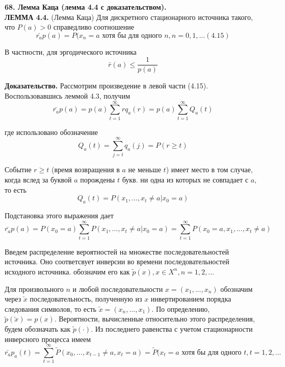 \documentclass[14pt]{article}
\begin{document}
\bigskip
\textbf{68. Лемма Каца (лемма 4.4 с доказательством).} \\

\textbf{ЛЕММА 4.4.} (Лемма Каца) Для дискретного стационарного источника такого, что \(P(a) > 0\) справедливо соотношение \[\bar{r_a}p(a)= P(x_n = a \textrm{ хотя бы для одного } n, n = 0, 1, ...    (4.15)\]

В частности, для эргодического источника
\begin{displaymath}
    \bar{r}(a) \leq \frac{1}{p(a)}
\end{displaymath}

\textbf{Доказательство.} Рассмотрим произведение в левой части (4.15). Воспользовавшись леммой 4.3, получим
\begin{displaymath}
    \bar{r_a}p(a) = p(a) \sum_{t=1}^{\infty} r q_a(r) = p(a) \sum_{t=1}^{\infty} Q_a(t)
\end{displaymath}

где использовано обозначение
\begin{displaymath}
    Q_a(t) = \sum_{j=t}^{\infty} q_a(j) = P(r \geq t)
\end{displaymath}

Событие \(r \geq t\) (время возвращения в \(a\) не меньше \(t\)) имеет место в том случае, когда вслед за буквой \(a\) порождены \(t\) букв. ни одна из которых не совпадает с \(a\), то есть
\begin{displaymath}
    Q_a(t) = P(x_1,...,x_t \neq a|x_0 = a)
\end{displaymath}

Подстановка этого выражения дает
\begin{displaymath}
    \bar{r_a}p(a) = P(x_0 = a) \sum_{t=1}^{\infty} P(x_1,...,x_t \neq a|x_0 = a) = \sum_{t=1}^{\infty} P(x_0 = a,x_1,...,x_t \neq a)
\end{displaymath}

Введем распределение вероятностей на множестве последовательностей источника. Оно соответсвует инверсии во времени последовательностей исходного источника. обозначим его как  \(\tilde{p}(x), x \in X^n, n = 1, 2, ...\)

Для произвольного \(n\) и любой последовательности \(x = (x_1,...,x_n)\) обозначим через \(\overleftarrow{x}\) последовательность, полученную из \(x\)  инвертированием порядка следования символов, то есть \(\overleftarrow{x} = (x_n,...,x_1)\). По определению, \(\tilde{p}(\overleftarrow{x}) = p(x)\). Вероятности, вычисленные относительно этого распределения, будем обозначать как \(\tilde{p}(\cdot)\). Из последнего равенства с учетом стационарности инверсного процесса имеем
\begin{displaymath}
    \bar{r_a}p_a(t) = \sum_{t=1}^{\infty} \tilde{P}(x_0,...,x_{t-1} \neq a, x_t = a) = \tilde{P}(x_t = a \textrm{ хотя бы для одного } t, t = 1, 2, ...
\end{displaymath}
\end{document}
